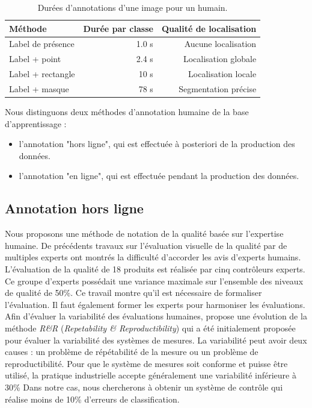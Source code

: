 \begin{table}[]
    \centering
    \begin{tabular}{|l|r|r|}
        \arrayrulecolor{black}
        \hline
        Méthode           & Durée par classe & Qualité de localisation \\
        \hline
        \hline
        Label de présence & 1.0 s & Aucune localisation \\
        \hline
        Label + point & 2.4 s & Localisation globale \\
        \hline
        Label + rectangle & 10 s & Localisation locale \\
        \hline
        Label + masque & 78 s & Segmentation précise \\
        \hline
    \end{tabular}
    \caption{Durées d'annotations d'une image pour un humain.}
    \label{tab:annotation}
\end{table}

Nous distinguons deux méthodes d'annotation humaine de la base d'apprentissage :
\begin{itemize}
    \item l'annotation "hors ligne", qui est effectuée à posteriori de la production des données.
    \item l'annotation "en ligne", qui est effectuée pendant la production des données.
\end{itemize}

\subsection{Annotation hors ligne}
Nous proposons une méthode de notation de la qualité basée sur l'expertise humaine.
De précédents travaux sur l'évaluation visuelle de la qualité par de multiples experts \cite{baudet_visual_2011} ont montrés la difficulté d'accorder les avis d'experts humains.
L'évaluation de la qualité de 18 produits est réalisée par cinq contrôleurs experts.
Ce groupe d'experts possédait une variance maximale sur l'ensemble des niveaux de qualité de 50\%.
Ce travail montre qu'il est nécessaire de formaliser l'évaluation.
Il faut également former les experts pour harmoniser les évaluations.
Afin d'évaluer la variabilité des évaluations humaines,  \cite{baudet_maitrise_2012} propose une évolution de la méthode \textit{R\&R} \cite{automotiveindustryactiongroup_measurement_2010} (\textit{Repetability \& Reproductibility}) qui a été initialement proposée pour évaluer la variabilité des systèmes de mesures.
La variabilité peut avoir deux causes : un problème de répétabilité de la mesure ou un problème de reproductibilité.
Pour que le système de mesures soit conforme et puisse être utilisé, la pratique industrielle accepte généralement une variabilité inférieure à 30\%
Dans notre cas, nous chercherons à obtenir un système de contrôle qui réalise moins de 10\% d'erreurs de classification.

